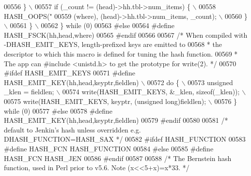 \begin{DoxyCode}
{{{{{{{00556 \textcolor{preprocessor}{    \}                                                                            \(\backslash\)}
00557 \textcolor{preprocessor}{    if (\_count != (head)->hh.tbl->num\_items) \{                                   \(\backslash\)}
00558 \textcolor{preprocessor}{      HASH\_OOPS("%
00559 \textcolor{preprocessor}{          (where), (head)->hh.tbl->num\_items, \_count);                           \(\backslash\)}
00560 \textcolor{preprocessor}{    \}                                                                            \(\backslash\)}
00561 \textcolor{preprocessor}{  \}                                                                              \(\backslash\)}
00562 \textcolor{preprocessor}{\} while (0)}
00563 \textcolor{preprocessor}{#else}
00564 \textcolor{preprocessor}{#define HASH\_FSCK(hh,head,where)}
00565 \textcolor{preprocessor}{#endif}
00566 
00567 \textcolor{comment}{/* When compiled with -DHASH\_EMIT\_KEYS, length-prefixed keys are emitted to}
00568 \textcolor{comment}{ * the descriptor to which this macro is defined for tuning the hash function.}
00569 \textcolor{comment}{ * The app can #include <unistd.h> to get the prototype for write(2). */}
00570 \textcolor{preprocessor}{#ifdef HASH\_EMIT\_KEYS}
00571 \textcolor{preprocessor}{#define HASH\_EMIT\_KEY(hh,head,keyptr,fieldlen)                                   \(\backslash\)}
00572 \textcolor{preprocessor}{do \{                                                                             \(\backslash\)}
00573 \textcolor{preprocessor}{  unsigned \_klen = fieldlen;                                                     \(\backslash\)}
00574 \textcolor{preprocessor}{  write(HASH\_EMIT\_KEYS, &\_klen, sizeof(\_klen));                                  \(\backslash\)}
00575 \textcolor{preprocessor}{  write(HASH\_EMIT\_KEYS, keyptr, (unsigned long)fieldlen);                        \(\backslash\)}
00576 \textcolor{preprocessor}{\} while (0)}
00577 \textcolor{preprocessor}{#else}
00578 \textcolor{preprocessor}{#define HASH\_EMIT\_KEY(hh,head,keyptr,fieldlen)}
00579 \textcolor{preprocessor}{#endif}
00580 
00581 \textcolor{comment}{/* default to Jenkin's hash unless overridden e.g. DHASH\_FUNCTION=HASH\_SAX */}
00582 \textcolor{preprocessor}{#ifdef HASH\_FUNCTION}
00583 \textcolor{preprocessor}{#define HASH\_FCN HASH\_FUNCTION}
00584 \textcolor{preprocessor}{#else}
00585 \textcolor{preprocessor}{#define HASH\_FCN HASH\_JEN}
00586 \textcolor{preprocessor}{#endif}
00587 
00588 \textcolor{comment}{/* The Bernstein hash function, used in Perl prior to v5.6. Note (x<<5+x)=x*33. */}
}}}}}}}}
\end{DoxyCode}
